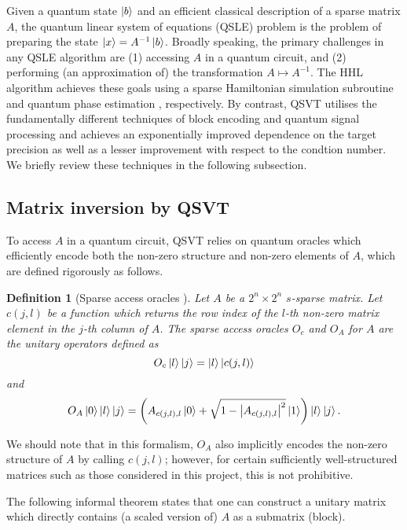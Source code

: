 \documentclass[10pt, twocolumn]{article}
\newtheorem{definition}[theorem]{Definition}
\begin{document}
Given a quantum state $\ket{b}$ and an efficient classical description of a sparse matrix $A$, the quantum linear system of equations (QSLE) problem is the problem of preparing the state $\ket{x} = A^{-1} \ket{b}$. Broadly speaking, the primary challenges in any QSLE algorithm are (1) accessing $A$ in a quantum circuit, and (2) performing (an approximation of) the transformation $A \mapsto A^{-1}$. The HHL algorithm \cite{harrow2009quantum} achieves these goals using a sparse Hamiltonian simulation subroutine \cite{berry2007efficient} and quantum phase estimation \cite{kitaev1995quantum}, respectively. By contrast, QSVT utilises the fundamentally different techniques of block encoding \cite{gilyen2019quantum} and quantum signal processing \cite{low2017optimal} and achieves an exponentially improved dependence on the target precision as well as a lesser improvement with respect to the condtion number. We briefly review these techniques in the following subsection.

\subsection{Matrix inversion by QSVT}

To access $A$ in a quantum circuit, QSVT relies on quantum oracles which efficiently encode both the non-zero structure and non-zero elements of $A$, which are defined rigorously as follows.

\begin{definition}[Sparse access oracles \cite{camps2203explicit}]
	\label{def::sparse_access_oracles}
	Let $A$ be a $2^n \times 2^n$ $s$-sparse matrix. Let $c(j,l)$ be a function which returns the row index of the $l$-th non-zero matrix element in the $j$-th column of $A$. The sparse access oracles $O_c$ and $O_A$ for $A$ are the unitary operators defined as
	\[
		O_c \ket{l}\ket{j} = \ket{l}\ket{c(j, l)}
	\]
	and
	\[
		O_A \ket{0}\ket{l}\ket{j} = \left( A_{c(j, l), l} \ket{0} + \sqrt{1 - \abs{A_{c(j, l), l}}^2 } \ket{1} \right) \ket{l} \ket{j}.
	\]
\end{definition}

We should note that in this formalism, $O_A$ also implicitly encodes the non-zero structure of $A$ by calling $c(j, l)$; however, for certain sufficiently well-structured matrices such as those considered in this project, this is not prohibitive.

The following informal theorem states that one can construct a unitary matrix which directly contains (a scaled version of) $A$ as a submatrix (block).
\end{document}
